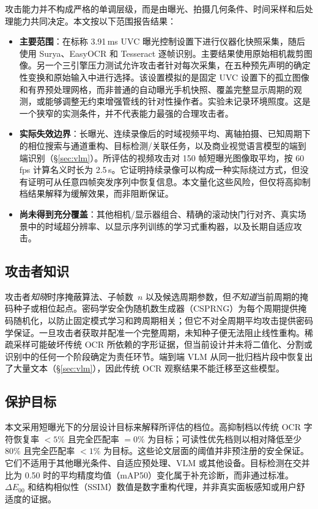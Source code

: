 \documentclass{ieeeaccess}
\begin{document}
攻击能力并不构成严格的单调层级，而是由曝光、拍摄几何条件、时间采样和后处理能力共同决定。本文按以下范围报告结果：
\begin{itemize}
\item \textbf{主要范围}：在标称 3.91\,ms UVC 曝光控制设置下进行仪器化快照采集，随后使用 Surya、EasyOCR 和 Tesseract 逐帧识别。主要结果使用原始相机裁剪图像。另一个三引擎压力测试允许攻击者针对每次采集，在五种预先声明的确定性变换和原始输入中进行选择。该设置模拟的是固定 UVC 设置下的孤立图像和有界预处理网格，而非普通的自动曝光手机快照、覆盖完整显示周期的观测，或能够调整无约束增强管线的针对性操作者。实验未记录环境照度。这是一个狭窄的实测条件，并不代表能力最强的合理攻击者。
\item \textbf{实际失效边界}：长曝光、连续录像后的时域视频平均、离轴拍摄、已知周期下的相位搜索与通道重构、目标检测/关联任务，以及商业视觉语言模型的端到端识别（\S\ref{sec:vlm}）。所评估的视频攻击对 150 帧短曝光图像取平均，按 60\,fps 计算名义时长为 2.5\,s。它证明持续录像可以构成一种实际绕过方式，但没有证明可从任意四帧突发序列中恢复信息。本文量化这些风险，但仅将高抑制档结果解释为缓解效果，而非阻断保证。
\item \textbf{尚未得到充分覆盖}：其他相机/显示器组合、精确的滚动快门行对齐、真实场景中的时域超分辨率、以显示序列训练的学习式重构器，以及长期自适应攻击。
\end{itemize}

\subsection{攻击者知识}

攻击者\emph{知晓}时序掩蔽算法、子帧数~$n$ 以及候选周期参数，但\emph{不知道}当前周期的掩码种子或相位起点。密码学安全伪随机数生成器（CSPRNG）为每个周期提供掩码随机化，以防止固定模式学习和跨周期相关；但它不对全周期平均攻击提供密码学保证。一旦攻击者获取并配准一个完整周期，未知种子便无法阻止线性重构。稀疏采样可能破坏传统 OCR 所依赖的字形证据，但当前设计并未将二值化、分割或识别中的任何一个阶段确定为责任环节。端到端 VLM 从同一批归档片段中恢复出了大量文本（\S\ref{sec:vlm}），因此传统 OCR 观察结果不能迁移至这些模型。

\subsection{保护目标}

本文采用短曝光下的分层设计目标来解释所评估的档位。高抑制档以传统 OCR 字符恢复率 $<5\%$ 且完全匹配率 $=0\%$ 为目标；可读性优先档则以相对降低至少 80\% 且完全匹配率 $<1\%$ 为目标。这些论文层面的阈值并非预注册的安全保证。它们不适用于其他曝光条件、自适应预处理、VLM 或其他设备。目标检测在交并比为 0.50 时的平均精度均值（mAP50）变化属于补充诊断，而非通过标准。$\Delta E_{00}$ 和结构相似性（SSIM）数值是数字重构代理，并非真实面板感知或用户舒适度的证据。


\end{document}
